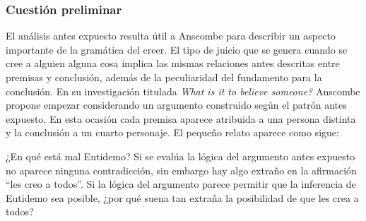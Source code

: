 \subsubsection{Cuestión preliminar}
El análisis antes expuesto resulta útil a Anscombe para describir un aspecto
importante de la gramática del creer. El tipo de juicio que se genera cuando se
cree a alguien alguna cosa implica las mismas relaciones antes descritas entre
premisas y conclusión, además de la peculiaridad del fundamento para la
conclusión. En su investigación titulada \emph{What is it to believe someone?}
Anscombe propone empezar considerando un argumento construido según el patrón
antes expuesto. En esta ocasión cada premisa aparece atribuida a una persona
distinta y la conclusión a un cuarto personaje. El pequeño relato aparece como
sigue: 

¿En qué está mal Eutidemo? Si se evalúa la lógica del argumento antes expuesto
no aparece ninguna contradicción, sin embargo hay algo extraño en la afirmación
``les creo a todos''. Si la lógica del argumento parece permitir que la
inferencia de Eutidemo sea posible, ¿por qué suena tan extraña la posibilidad de
que les crea a todos?

